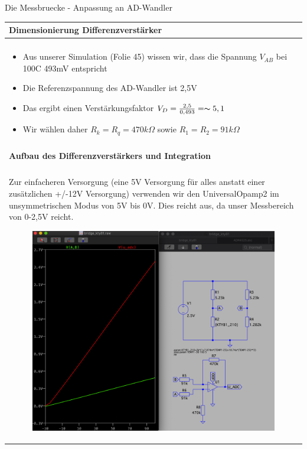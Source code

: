 \begin{frame}[t]{Die Messbruecke - Anpassung an AD-Wandler}

    \begin{spacing}{0.9} \begin{tiny}
            \begin{table}[h!]
                \begin{tabular}{p{10cm} }
                    \hline
                    \textbf{Dimensionierung Differenzverstärker}             \\
                    \hline                                                   \\
                    \begin{minipage}{\textwidth}
                        \begin{itemize}
                            \item Aus unserer Simulation (Folie 45) wissen wir, dass die Spannung $V_{AB}$ bei 100C 493mV entspricht
                            \item Die Referenzspannung des AD-Wandler ist 2,5V
                            \item Das ergibt einen Verstärkungsfaktor $V_D=\frac{2,5}{0,493}=\thicksim 5,1$
                            \item Wir wählen daher $R_k=R_q=470k\Omega$ sowie $R_1=R_2=91k\Omega$
                        \end{itemize}
                    \end{minipage}
                    \\\\
                    \hline
                    \textbf{Aufbau des Differenzverstärkers und Integration} \\
                    \hline                                                   \\
                    \begin{minipage}{\textwidth}
                        Zur einfacheren Versorgung (eine 5V Versorgung für alles anstatt einer zusätzlichen +/-12V Versorgung)
                        verwenden wir den UniversalOpamp2 im unsymmetrischen Modus von 5V bis 0V. Dies reicht aus, da unser Messbereich
                        von 0-2,5V reicht.
                        \begin{figure}
                            \centering
                            \includegraphics[width=0.5\linewidth]{pictures/diff_ampl_uadc_1.png}

\end{figure}
\end{minipage}
\end{tabular}
\end{table}
\end{tiny}
\end{spacing}
\end{frame}
